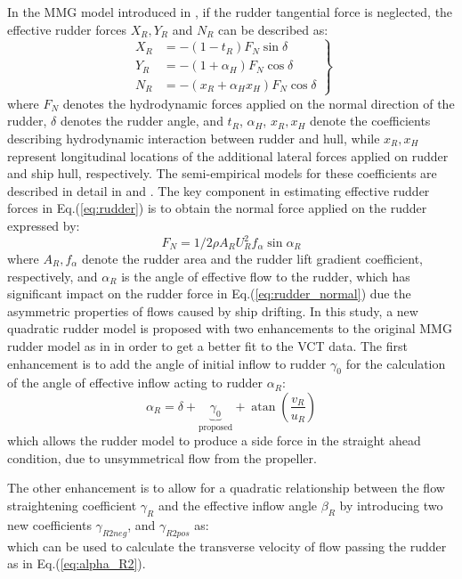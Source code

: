 \noindent In the MMG model introduced in \citet{yasukawaIntroductionMMGStandard2015}, if the rudder tangential force is neglected, the effective rudder forces $X_R, Y_R$ and $N_R$ can be described as:
\begin{equation}
   \label{eq:rudder}
  \left.\begin{aligned}
  X_R & = - (1-t_R) F_N \sin \delta\\
  Y_R & = - (1+ \alpha_H) F_N \cos \delta\\
  N_R & = - (x_R + \alpha_H x_H) F_N \cos \delta
\end{aligned}\right\}
\end{equation}
where $F_N$ denotes the hydrodynamic forces applied on the normal direction of the rudder, $\delta$ denotes the rudder angle, and $t_R$, $\alpha_H$, $x_R, x_H$ denote the coefficients describing hydrodynamic interaction between rudder and hull, while $x_R, x_H$ represent longitudinal locations of the additional lateral forces applied on rudder and ship hull, respectively. The semi-empirical models for these coefficients are described in detail in \citet{yasukawaIntroductionMMGStandard2015} and \citet{alexanderssonSystemIdentificationPhysicsinformed2024b}. The key component in estimating effective rudder forces in Eq.(\ref{eq:rudder}) is to obtain the normal force applied on the rudder expressed by:
\begin{equation}
    \label{eq:rudder_normal}
    F_N = 1/2 \rho A_R U_R^{2} f_{\alpha} \sin \alpha_R
\end{equation}
where $A_R, f_\alpha$ denote the rudder area and the rudder lift gradient coefficient, respectively, and $\alpha_R$ is the angle of effective flow to the rudder, which has significant impact on the rudder force in Eq.(\ref{eq:rudder_normal}) due the asymmetric properties of flows caused by ship drifting.
In this study, a new quadratic rudder model is proposed with two enhancements to the original MMG rudder model as in \citet{yasukawaIntroductionMMGStandard2015}  in order to get a better fit to the VCT data. The first enhancement is to add the angle of initial inflow to rudder  $\gamma_0$ for the calculation of the angle of effective inflow acting to rudder $\alpha_R$:  
\begin{equation}
    \label{eq:alpha_R2}
    \alpha_{R} = \delta + \underbrace{\gamma_{0}}_{\text{proposed}} + \operatorname{atan}{\left(\frac{v_{R}}{u_{R}} \right)}
\end{equation}
which allows the rudder model to produce a side force in the straight ahead condition, due to unsymmetrical flow from the propeller.

The other enhancement is to allow for a quadratic relationship between the flow straightening coefficient $\gamma_R$ and the effective inflow angle $\beta_R$ by introducing two new coefficients $\gamma_{R2neg}$, and $\gamma_{R2pos}$ as:  
\begin{equation}
    \label{eq:gamma_R2}
    
\end{equation}
which can be used to calculate the transverse velocity of flow passing the rudder as in Eq.(\ref{eq:alpha_R2}). 
